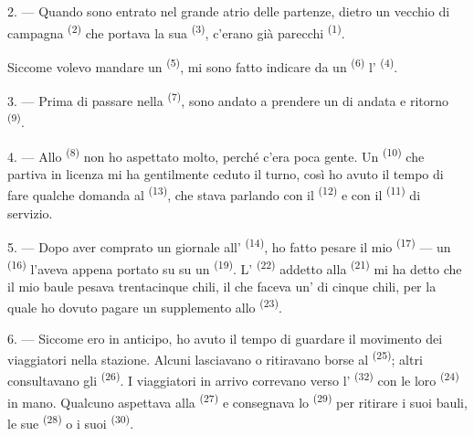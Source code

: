2. --- Quando sono entrato nel grande atrio delle partenze, dietro un vecchio
 di campagna \textsuperscript{(2)} che portava la sua
 \textsuperscript{(3)}, c'erano già parecchi
 \textsuperscript{(1)}.

Siccome volevo mandare un  \textsuperscript{(5)}, mi sono fatto
indicare da un  \textsuperscript{(6)} l'
\textsuperscript{(4)}.

3. --- Prima di passare nella  \textsuperscript{(7)}, sono
andato a prendere un  di andata e ritorno \textsuperscript{(9)}.

4. --- Allo  \textsuperscript{(8)} non ho aspettato molto, perché
c'era poca gente. Un  \textsuperscript{(10)} che partiva in licenza mi
ha gentilmente ceduto il turno, così ho avuto il tempo di fare qualche domanda al
 \textsuperscript{(13)}, che stava parlando con il
 \textsuperscript{(12)} e con il 
\textsuperscript{(11)} di servizio.

\VUsaut{3.0mm}

5. --- Dopo aver comprato un giornale all' \textsuperscript{(14)}, ho
fatto pesare il mio  \textsuperscript{(17)} --- un
 \textsuperscript{(16)} l'aveva appena portato su su un
 \textsuperscript{(19)}. L'
\textsuperscript{(22)} addetto alla  \textsuperscript{(21)} mi ha
detto che il mio baule pesava trentacinque chili, il che faceva
un' di cinque chili, per la quale ho dovuto pagare un supplemento
allo  \textsuperscript{(23)}.

6. --- Siccome ero in anticipo, ho avuto il tempo di guardare il movimento dei
viaggiatori nella stazione. Alcuni lasciavano o ritiravano borse al
 \textsuperscript{(25)}; altri consultavano gli
 \textsuperscript{(26)}. I viaggiatori in arrivo correvano verso
l' \textsuperscript{(32)} con le loro 
\textsuperscript{(24)} in mano. Qualcuno aspettava alla 
\textsuperscript{(27)} e consegnava lo  \textsuperscript{(29)} per
ritirare i suoi bauli, le sue  \textsuperscript{(28)} o i suoi
 \textsuperscript{(30)}.

